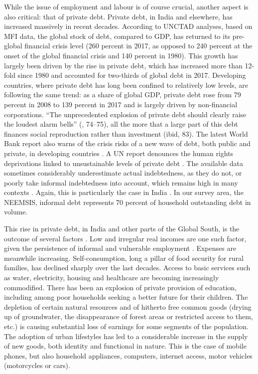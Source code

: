 \documentclass[a4paper, 11pt, onecolumn]{article}
\begin{document}
While the issue of employment and labour is of course crucial, another aspect is also critical: that of private debt. Private debt, in India and elsewhere, has increased massively in recent decades.  According to UNCTAD analyses, based on MFI data, the global stock of debt, compared to GDP, has returned to its pre-global financial crisis level (260 percent in 2017, as opposed to 240 percent at the onset of the global financial crisis and 140 percent in 1980). This growth has largely been driven by the rise in private debt, which has increased more than 12-fold since 1980 and accounted for two-thirds of global debt in 2017. Developing countries, where private debt has long been confined to relatively low levels, are following the same trend: as a share of global GDP, private debt rose from 79 percent in 2008 to 139 percent in 2017 and is largely driven by non-financial corporations. ``The unprecedented explosion of private debt should clearly raise the loudest alarm bells'' (\cite{UNCTAD2019}, 74–75), all the more that a large part of this debt finances social reproduction rather than investment (ibid, 83). The latest World Bank report also warns of the crisis risks of a new wave of debt, both public and private, in developing countries \citep{WorldBank2020}. A UN report denounces the human rights deprivations linked to unsustainable levels of private debt \citep{UN2020}. The available data sometimes considerably underestimate actual indebtedness, as they do not, or poorly take informal indebtedness into account, which remains high in many contexts \citep{Collins2009, Demirguc2018}. Again, this is particularly the case in India  \citep{Gregory1997, Nair2016}. In our survey area, the NEEMSIS, informal debt represents 70 percent of household outstanding debt in volume.

This rise in private debt, in India and other parts of the Global South, is the outcome of several factors \citep{Servet2013, UN2020}. Low and irregular real incomes are one such factor, given the persistence of informal and vulnerable employment \citep{ILO2018}. Expenses are meanwhile increasing. Self-consumption, long a pillar of food security for rural families, has declined sharply over the last decades. Access to basic services such as water, electricity, housing and healthcare are becoming increasingly commodified. There has been an explosion of private provision of education, including among poor households seeking a better future for their children. The depletion of certain natural resources and of hitherto free common goods (drying up of groundwater, the disappearance of forest areas or restricted access to them, etc.) is causing substantial loss of earnings for some segments of the population. The adoption of urban lifestyles has led to a considerable increase in the supply of new goods, both identity and functional in nature. This is the case of mobile phones, but also household appliances, computers, internet access, motor vehicles (motorcycles or cars). 
\end{document}

